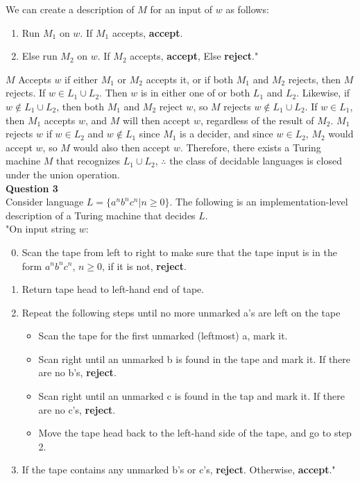 \documentclass{article}
\begin{document}
We can create a description of $M$ for an input of $w$ as follows:
\begin{enumerate}
  \item Run $M_1$ on $w$. If $M_1$ accepts, {\bf accept}.
  \item Else run $M_2$ on $w$. If $M_2$ accepts, {\bf accept}, Else {\bf reject}."
\end{enumerate}

$M$ Accepts $w$ if either $M_1$ or $M_2$ accepts it, or if both $M_1$ and $M_2$ rejects, then $M$ rejects.
If $w \in L_1 \cup L_2$. Then $w$ is in either one of or both $L_1$ and $L_2$.
Likewise, if $w \notin L_1 \cup L_2$, then both $M_1$ and $M_2$ reject $w$, so $M$ rejects $w \notin L_1 \cup L_2$. 
If $w \in L_1$, then $M_1$ accepts $w$, and $M$ will then accept $w$, regardless of the result of $M_2$.
$M_1$ rejects $w$ if $w \in L_2$ and $w \notin L_1$ since $M_1$ is a decider, and since $w \in L_2$, $M_2$ would accept $w$, so $M$ would also then accept $w$.
Therefore, there exists a Turing machine $M$ that recognizes $L_1 \cup L_2$, $\therefore$ the class of decidable languages is closed under the union operation.\\



\bigskip
{\bf Question 3}\\
Consider language $L = \{a^nb^nc^n | n \geq 0 \}$. The following is an implementation-level description of a Turing machine that decides $L$.\\

"On input string $w$:
\begin{enumerate}
  \setcounter{enumi}{-1}
  \item Scan the tape from left to right to make sure that the tape input is in the form $a^nb^nc^n$, $n \geq 0$, if it is not, {\bf reject}.
  \item Return tape head to left-hand end of tape.
  \item Repeat the following steps until no more unmarked a's are left on the tape
  \begin{itemize}
      \item Scan the tape for the first unmarked (leftmost) a, mark it.
      \item Scan right until an unmarked b is found in the tape and mark it. If there are no b's, {\bf reject}.
      \item Scan right until an unmarked c is found in the tap and mark it. If there are no c's, {\bf reject}.
      \item Move the tape head back to the left-hand side of the tape, and go to step 2.
  \end{itemize}
  \item If the tape contains any unmarked b's or c's, {\bf reject}. Otherwise, {\bf  accept}."
\end{enumerate}
\end{document}

